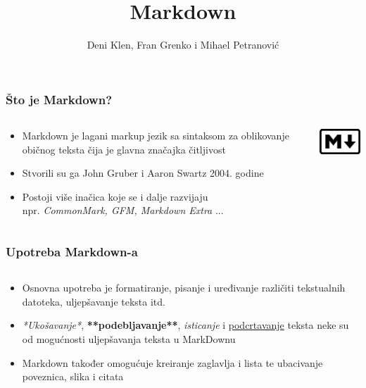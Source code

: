 \documentclass{beamer}
\begin{document}
\title{Markdown}
\author{Deni Klen, Fran Grenko i Mihael Petranović}
\maketitle






\begin{frame}
	\frametitle{Što je Markdown?}

 	\begin{minipage}[0.2\textheight]{\textwidth}
 	\begin{columns}[T]
 	\begin{column}{0.8\textwidth}
 	\begin{itemize}
		\item{Markdown je lagani markup jezik sa sintaksom za oblikovanje običnog teksta čija je glavna značajka čitljivost}
		\item{Stvorili su ga John Gruber i Aaron Swartz 2004. godine}
		\item{Postoji više inačica koje se i dalje razvijaju \\ npr. \textit{CommonMark, GFM, Markdown Extra} ...}
	\end{itemize}
	\end{column}
	\begin{column}{0.2\textwidth}
	\includegraphics[width=2.5cm]{Slike/markdown.png}
	\end{column}
	\end{columns}
	\end{minipage}

\end{frame}





\begin{frame}
	\frametitle{Upotreba Markdown-a}

 	\begin{minipage}[0.2\textheight]{\textwidth}
 	\begin{columns}[T]
 	\begin{column}{0.8\textwidth}
 	\begin{itemize}
		\item{Osnovna upotreba je formatiranje, pisanje i uređivanje različiti tekstualnih datoteka, uljepšavanje teksta itd.}
		\item{\textit{*Ukošavanje*}, \textbf{**podebljavanje**}, \emph{isticanje} i \underline{podcrtavanje} teksta neke su od mogućnosti uljepšavanja teksta u MarkDownu}
		\item{Markdown također omogućuje kreiranje zaglavlja i lista te ubacivanje poveznica, slika i citata}
	\end{itemize}
	\end{column}
	\end{columns}
	\end{minipage}

\end{frame}
\end{document}
